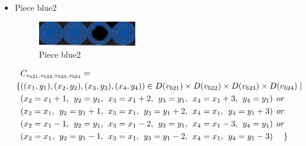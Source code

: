 \begin{appendices}
\begin{itemize}
\begin{align*}
\end{align*}  
  \item Piece blue2\\
\begin{figure}[H]
    \centering
    \includegraphics[width=0.4\textwidth]{figs/blue2.jpg}
    \caption{Piece blue2}
\end{figure}
  \begin{align*}
&\Const{b21}{b22}{b23}{b24}=\\
\{&((x_{1},y_{1}),(x_{2},y_{2}),(x_{3},y_{3}),(x_{4},y_{4}))\in \Domain{b21}\times \Domain{b22}\times\Domain{b23}\times\Domain{b24}\mid\\
&(x_{2} = x_{1} + 1,\hspace{1ex}y_{2} = y_{1},\hspace{1ex}x_{3} = x_{1} + 2, \hspace{1ex}y_{3} = y_{1},\hspace{1ex}x_{4} = x_{1}+3,\hspace{1ex}y_{4} = y_{1})\hspace{1ex} or\\
&(x_{2} = x_{1},\hspace{1ex}y_{2} = y_{1}+1,\hspace{1ex}x_{3} = x_{1}, \hspace{1ex}y_{3} = y_{1}+2,\hspace{1ex}x_{4} = x_{1},\hspace{1ex}y_{4} = y_{1}+3)\hspace{1ex} or\\
&(x_{2} = x_{1}-1,\hspace{1ex}y_{2} = y_{1},\hspace{1ex}x_{3} = x_{1}-2,\hspace{1ex} y_{3} = y_{1},\hspace{1ex}x_{4} = x_{1}-3,\hspace{1ex}y_{4} = y_{1})\hspace{1ex} or\\
&(x_{2} = x_{1},\hspace{1ex}y_{2} = y_{1}-1,\hspace{1ex}x_{3} = x_{1}, \hspace{1ex}y_{3} = y_{1}-2,\hspace{1ex}x_{4} = x_{1},\hspace{1ex}y_{4} = y_{1}-3)\hspace{3ex} \}

\end{align*}
\end{itemize}
\end{appendices}
